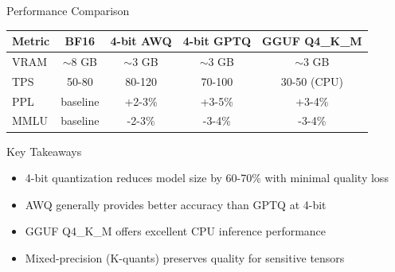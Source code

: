 \documentclass[aspectratio=169,10pt]{beamer}
\begin{document}
\begin{frame}{Performance Comparison}
    \begin{table}
        \centering
        \small
        \begin{tabular}{lcccc}
            \toprule
            \textbf{Metric} & \textbf{BF16} & \textbf{4-bit AWQ} & \textbf{4-bit GPTQ} & \textbf{GGUF Q4\_K\_M} \\
            \midrule
            VRAM & $\sim$8 GB & $\sim$3 GB & $\sim$3 GB & $\sim$3 GB \\
            TPS & 50-80 & 80-120 & 70-100 & 30-50 (CPU) \\
            PPL & baseline & +2-3\% & +3-5\% & +3-4\% \\
            MMLU & baseline & -2-3\% & -3-4\% & -3-4\% \\
            \bottomrule
        \end{tabular}
    \end{table}

    \vspace{0.5cm}
    \begin{block}{Key Takeaways}
        \begin{itemize}
            \item 4-bit quantization reduces model size by 60-70\% with minimal quality loss
            \item AWQ generally provides better accuracy than GPTQ at 4-bit
            \item GGUF Q4\_K\_M offers excellent CPU inference performance
            \item Mixed-precision (K-quants) preserves quality for sensitive tensors
        \end{itemize}
    \end{block}
\end{frame}
\end{document}
